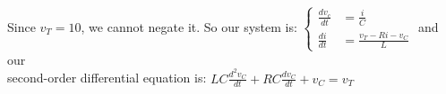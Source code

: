 \documentclass[preview]{standalone}
\begin{document}
\begin{center}
Since $v_T = 10$, we cannot negate it. So our system is:
                    \(\left\{
                    \begin{aligned}
                        \frac{dv_c}{dt} &= \frac{i}{C} \\
                        \frac{di}{dt} &= \frac{v_T -Ri - v_C}{L}
                    \end{aligned}
                    \right.\) and our \\
                    second-order differential equation is: 
                        $ LC\frac{d^2v_C}{dt} + RC\frac{dv_C}{dt} + v_C = v_T $
\end{center}
\end{document}
